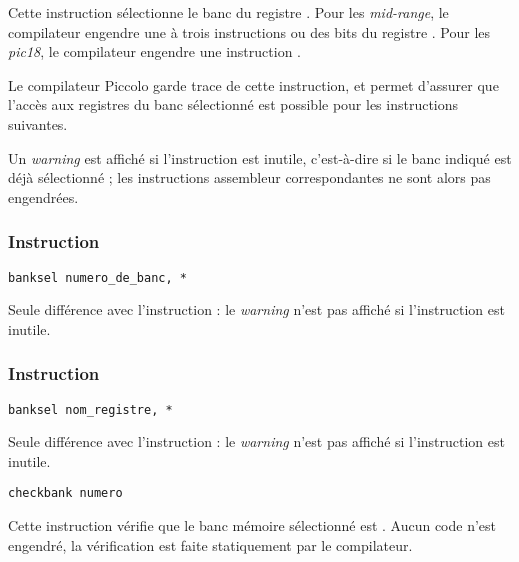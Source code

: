 Cette instruction sélectionne le banc du registre . Pour les \emph{mid-range}, le compilateur engendre une à trois instructions  ou  des bits  du registre . Pour les \emph{pic18}, le compilateur engendre une instruction .

Le compilateur Piccolo garde trace de cette instruction, et permet d'assurer que l'accès aux registres du banc sélectionné est possible pour les instructions suivantes.

Un \emph{warning} est affiché si l'instruction est inutile, c'est-à-dire si le banc indiqué est déjà sélectionné ; les instructions assembleur correspondantes ne sont alors pas engendrées.




\subsubsection{Instruction }
\begin{lstlisting}[language=piccolo]
banksel numero_de_banc, *
\end{lstlisting}

Seule différence avec l'instruction  : le \emph{warning} n'est pas affiché si l'instruction est inutile.






\subsubsection{Instruction }
\begin{lstlisting}[language=piccolo]
banksel nom_registre, *
\end{lstlisting}

Seule différence avec l'instruction  : le \emph{warning} n'est pas affiché si l'instruction est inutile.










\begin{lstlisting}[language=piccolo]
checkbank numero
\end{lstlisting}

Cette instruction vérifie que le banc mémoire sélectionné est . Aucun code n'est engendré, la vérification est faite statiquement par le compilateur.

